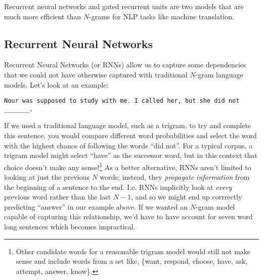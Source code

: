 \documentclass[12pt]{article}
\begin{document}
Recurrent neural networks and gated recurrent units are two models that are much more efficient than $N$-grams for NLP tasks like machine translation.

\subsection{Recurrent Neural Networks} Recurrent Neural Networks (or RNNs) allow us to capture some dependencies that we could not have otherwise captured with traditional $N$-gram language models. Let's look at an example:
\begin{verbatim}
Nour was supposed to study with me. I called her, but she did not _______.
\end{verbatim}

If we used a traditional language model, such as a trigram, to try and complete this sentence, you would compare different word probabilities and select the word with the highest chance of following the words ``did not''. For a typical corpus, a trigram model might select ``have'' as the successor word, but in this context that choice doesn't make any sense!\footnote{Other candidate words for a reasonable trigram model would still not make sense and include words from a set like, \{want, respond, choose, have, ask, attempt, answer, know\}.} As a better alternative, RNNs aren't limited to looking at just the previous $N$ words; instead, they \emph{propagate information} from the beginning of a sentence to the end. I.e. RNNs implicitly look at \emph{every} previous word rather than the last $N-1$, and so we might end up corrrectly predicting ``answer'' in our example above. If we wanted an $N$-gram model capable of capturing this relationship, we'd have to have account for seven word long sentences which becomes impractical.
\end{document}
